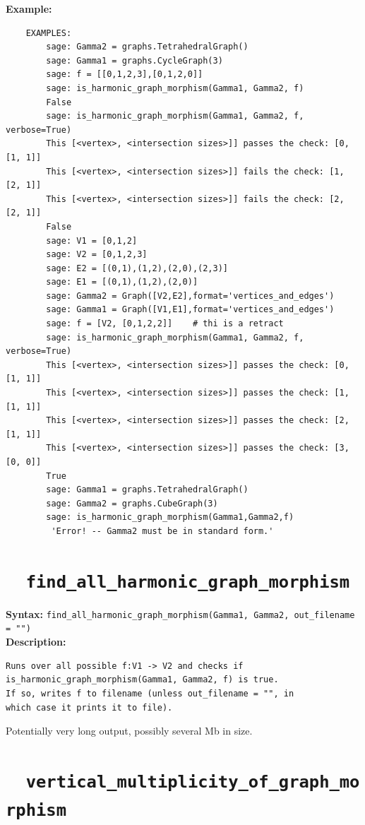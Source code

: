 \documentclass{article}
\begin{document}
\textbf{Example:}
\begin{verbatim}
    EXAMPLES:
        sage: Gamma2 = graphs.TetrahedralGraph()
        sage: Gamma1 = graphs.CycleGraph(3)
        sage: f = [[0,1,2,3],[0,1,2,0]]
        sage: is_harmonic_graph_morphism(Gamma1, Gamma2, f)
        False
        sage: is_harmonic_graph_morphism(Gamma1, Gamma2, f, verbose=True)
        This [<vertex>, <intersection sizes>]] passes the check: [0, [1, 1]]
        This [<vertex>, <intersection sizes>]] fails the check: [1, [2, 1]]
        This [<vertex>, <intersection sizes>]] fails the check: [2, [2, 1]]
        False
        sage: V1 = [0,1,2]
        sage: V2 = [0,1,2,3]
        sage: E2 = [(0,1),(1,2),(2,0),(2,3)]
        sage: E1 = [(0,1),(1,2),(2,0)]
        sage: Gamma2 = Graph([V2,E2],format='vertices_and_edges')
        sage: Gamma1 = Graph([V1,E1],format='vertices_and_edges')
        sage: f = [V2, [0,1,2,2]]    # thi is a retract
        sage: is_harmonic_graph_morphism(Gamma1, Gamma2, f, verbose=True)
        This [<vertex>, <intersection sizes>]] passes the check: [0, [1, 1]]
        This [<vertex>, <intersection sizes>]] passes the check: [1, [1, 1]]
        This [<vertex>, <intersection sizes>]] passes the check: [2, [1, 1]]
        This [<vertex>, <intersection sizes>]] passes the check: [3, [0, 0]]
        True
        sage: Gamma1 = graphs.TetrahedralGraph() 
        sage: Gamma2 = graphs.CubeGraph(3)
        sage: is_harmonic_graph_morphism(Gamma1,Gamma2,f)
         'Error! -- Gamma2 must be in standard form.'
\end{verbatim}

\section{\tt \ \ find\_all\_harmonic\_graph\_morphism}

\textbf{Syntax:} \verb}find_all_harmonic_graph_morphism(Gamma1, Gamma2, out_filename = "")}\\

\textbf{Description:}
\begin{verbatim}
Runs over all possible f:V1 -> V2 and checks if
is_harmonic_graph_morphism(Gamma1, Gamma2, f) is true.
If so, writes f to filename (unless out_filename = "", in
which case it prints it to file).
\end{verbatim}

Potentially very long output, possibly several Mb in size.

\section{\tt \ \ vertical\_multiplicity\_of\_graph\_morphism}
\end{document}
